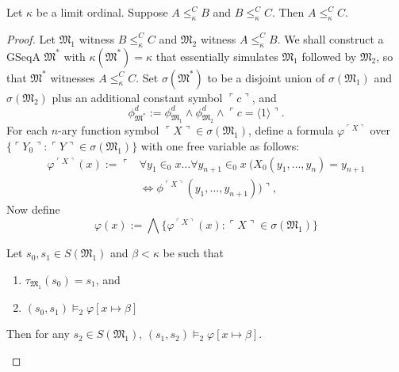 \documentclass[12pt]{article}
\numberwithin{equation}{section}
\begin{document}
\begin{prop}\label{prop245}
Let $\kappa$ be a limit ordinal. Suppose $A \leq^C_{\kappa} B$ and $B \leq^C_{\kappa} C$. Then $A \leq^C_{\kappa} C$.
\end{prop}

\begin{proof}
Let $\mathfrak{M}_1$ witness $B \leq^C_{\kappa} C$ and $\mathfrak{M}_2$ witness $A \leq^C_{\kappa} B$. We shall construct a GSeqA $\mathfrak{M}^*$ with $\kappa(\mathfrak{M}^*) = \kappa$ that essentially simulates $\mathfrak{M}_1$ followed by $\mathfrak{M}_2$, so that $\mathfrak{M}^*$ witnesses $A \leq^C_{\kappa} C$. Set $\sigma(\mathfrak{M}^*)$ to be a disjoint union of $\sigma(\mathfrak{M}_1)$ and $\sigma(\mathfrak{M}_2)$ plus an additional constant symbol $\ulcorner c \urcorner$, and 
\begin{equation*}
    \phi^d_{\mathfrak{M}^*} := \phi^d_{\mathfrak{M}_1} \wedge \phi^d_{\mathfrak{M}_2} \wedge \ulcorner c = \langle 1 \rangle \urcorner \text{.}
\end{equation*}
For each $n$-ary function symbol $\ulcorner X \urcorner \in \sigma(\mathfrak{M}_1)$, define a formula $\varphi^{\ulcorner X \urcorner}$ over $\{\ulcorner Y_0 \urcorner : \ulcorner Y \urcorner \in \sigma(\mathfrak{M}_1)\}$ with one free variable as follows:
\begin{align*}
    \varphi^{\ulcorner X \urcorner}(x) := \ulcorner & \forall y_1 \in_0 x \dots \forall y_{n+1} \in_0 x \ (X_0(y_1, \dots, y_n) = y_{n+1} \\ 
    & \iff \phi^{\ulcorner X \urcorner}(y_1, \dots, y_{n+1})) \urcorner \text{,}
\end{align*}
Now define 
\begin{equation*}
    \varphi(x) := \bigwedge \{\varphi^{\ulcorner X \urcorner}(x) : \ulcorner X \urcorner \in \sigma(\mathfrak{M}_1)\}
\end{equation*}

\begin{claim2}\label{834c}
Let $s_0, s_1 \in S(\mathfrak{M}_1)$ and $\beta < \kappa$ be such that 
\begin{enumerate}[label=(\roman*)]
    \item\label{834ci} $\tau_{\mathfrak{M}_1}(s_0) = s_1$, and
    \item\label{834ciii} $(s_0, s_1) \models_2 \varphi[x \mapsto \beta]$ 
\end{enumerate}
Then for any $s_2 \in S(\mathfrak{M}_1)$, $(s_1, s_2) \models_2 \varphi[x \mapsto \beta]$.
\end{claim2}


\end{proof}
\end{document}
